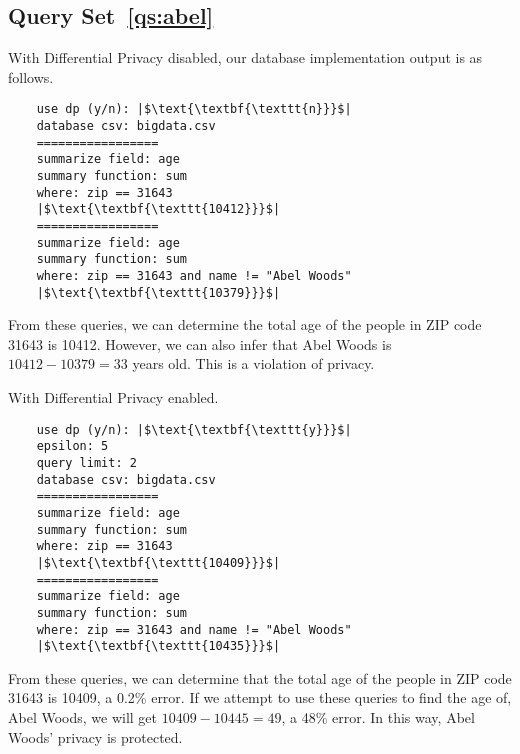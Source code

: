 \documentclass[conference,11pt]{IEEEtran}
\begin{document}
\subsection{Query Set~\ref{qs:abel}}

With Differential Privacy disabled, our database implementation output is as
follows.
\begin{verbatim}
    use dp (y/n): |$\text{\textbf{\texttt{n}}}$|
    database csv: bigdata.csv
    =================
    summarize field: age
    summary function: sum
    where: zip == 31643
    |$\text{\textbf{\texttt{10412}}}$|
    =================
    summarize field: age
    summary function: sum
    where: zip == 31643 and name != "Abel Woods"
    |$\text{\textbf{\texttt{10379}}}$|
\end{verbatim}
From these queries, we can determine the total age of the people in ZIP code
31643 is 10412. However, we can also infer that Abel Woods is $10412 - 10379 =
33$ years old. This is a violation of privacy.

With Differential Privacy enabled.
\begin{verbatim}
    use dp (y/n): |$\text{\textbf{\texttt{y}}}$|
    epsilon: 5
    query limit: 2
    database csv: bigdata.csv
    =================
    summarize field: age
    summary function: sum
    where: zip == 31643
    |$\text{\textbf{\texttt{10409}}}$|
    =================
    summarize field: age
    summary function: sum
    where: zip == 31643 and name != "Abel Woods"
    |$\text{\textbf{\texttt{10435}}}$|
\end{verbatim}
From these queries, we can determine that the total age of the people in ZIP
code 31643 is 10409, a 0.2\% error. If we attempt to use these queries to find
the age of, Abel Woods, we will get $10409 - 10445 = 49$, a 48\% error. In this
way, Abel Woods' privacy is protected.

\end{document}
